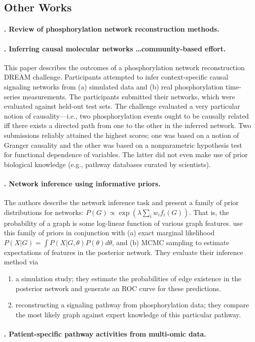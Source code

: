 \documentclass[14pt]{article}
\begin{document}
\subsection{Other Works}

\paragraph{ \citet{2018-invergo-review}. Review of phosphorylation network reconstruction methods. }

\paragraph{ \citet{2016-hill-community}. Inferring causal molecular networks \ldots community-based effort.}
This paper describes the outcomes of a phosphorylation network reconstruction DREAM challenge.
Participants attempted to infer context-specific causal signaling networks from (a) simulated data and (b) real phosphorylation time-series measurements.
The participants submitted their networks, which were evaluated against held-out test sets.
The challenge evaluated a very particular notion of causality---i.e., two phosphorylation events ought to be causally related iff there exists a directed path from one to the other in the inferred network.
Two submissions reliably attained the highest scores; one was based on a notion of Granger causality and the other was based on a nonparametric hypothesis test for functional dependence of variables.
The latter did not even make use of prior biological knowledge (e.g., pathway databases curated by scientists).

\paragraph{ \citet{2008-mukherjee-priors}. Network inference using informative priors.}
The authors describe the network inference task and present a family of prior distributions for networks:
$ P(G) \propto \exp\left( \lambda \sum_i w_i f_i(G) \right).$ 
That is, the probability of a graph is some log-linear function of various graph features. 
\citeauthor{2008-mukherjee-priors} use this family of priors in conjunction with 
(a) exact marginal likelihood $P(X | G) = \int P(X | G, \theta) P(\theta) d\theta$, and
(b) MCMC sampling
to estimate expectations of features in the posterior network.
They evaluate their inference method via 
\begin{enumerate}
    \item a simulation study; they estimate the probabilities of edge existence in the posterior network
        and generate an ROC curve for these predictions.
    \item reconstructing a signaling pathway from phosphorylation data; they compare the most likely
        graph against expert knowledge of this particular pathway.
\end{enumerate}

\paragraph{ \citet{2010-vaske-paradigm}. Patient-specific pathway activities from multi-omic data.}




\pagebreak
\end{document}
